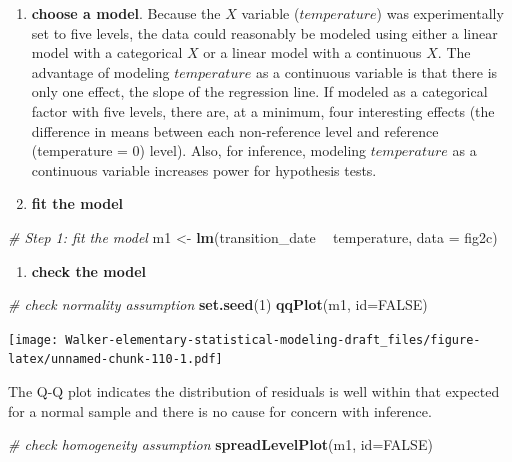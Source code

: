 \documentclass[]{book}
\newenvironment{Shaded}{\begin{snugshade}}{\end{snugshade}}
\newcommand{\CommentTok}[1]{\textcolor[rgb]{0.56,0.35,0.01}{\textit{#1}}}
\newcommand{\DataTypeTok}[1]{\textcolor[rgb]{0.13,0.29,0.53}{#1}}
\newcommand{\DecValTok}[1]{\textcolor[rgb]{0.00,0.00,0.81}{#1}}
\newcommand{\KeywordTok}[1]{\textcolor[rgb]{0.13,0.29,0.53}{\textbf{#1}}}
\newcommand{\NormalTok}[1]{#1}
\newcommand{\OperatorTok}[1]{\textcolor[rgb]{0.81,0.36,0.00}{\textbf{#1}}}
\newcommand{\OtherTok}[1]{\textcolor[rgb]{0.56,0.35,0.01}{#1}}
\newcommand{\StringTok}[1]{\textcolor[rgb]{0.31,0.60,0.02}{#1}}
\providecommand{\tightlist}{%
  \setlength{\itemsep}{0pt}\setlength{\parskip}{0pt}}
\begin{document}
\begin{enumerate}
\def\labelenumi{\arabic{enumi}.}
\setcounter{enumi}{1}
\item
  \textbf{choose a model}. Because the \(X\) variable (\(temperature\)) was experimentally set to five levels, the data could reasonably be modeled using either a linear model with a categorical \(X\) or a linear model with a continuous \(X\). The advantage of modeling \(temperature\) as a continuous variable is that there is only one effect, the slope of the regression line. If modeled as a categorical factor with five levels, there are, at a minimum, four interesting effects (the difference in means between each non-reference level and reference (temperature = 0) level). Also, for inference, modeling \(temperature\) as a continuous variable increases power for hypothesis tests.
\item
  \textbf{fit the model}
\end{enumerate}

\begin{Shaded}
\begin{Highlighting}[]
\CommentTok{# Step 1: fit the model}
\NormalTok{m1 <-}\StringTok{ }\KeywordTok{lm}\NormalTok{(transition_date }\OperatorTok{~}\StringTok{ }\NormalTok{temperature, }\DataTypeTok{data =}\NormalTok{ fig2c)}
\end{Highlighting}
\end{Shaded}

\begin{enumerate}
\def\labelenumi{\arabic{enumi}.}
\setcounter{enumi}{3}
\tightlist
\item
  \textbf{check the model}
\end{enumerate}

\begin{Shaded}
\begin{Highlighting}[]
\CommentTok{# check normality assumption}
\KeywordTok{set.seed}\NormalTok{(}\DecValTok{1}\NormalTok{)}
\KeywordTok{qqPlot}\NormalTok{(m1, }\DataTypeTok{id=}\OtherTok{FALSE}\NormalTok{)}
\end{Highlighting}
\end{Shaded}

\texttt{[image: Walker-elementary-statistical-modeling-draft\_files/figure-latex/unnamed-chunk-110-1.pdf]}

The Q-Q plot indicates the distribution of residuals is well within that expected for a normal sample and there is no cause for concern with inference.

\begin{Shaded}
\begin{Highlighting}[]
\CommentTok{# check homogeneity assumption}
\KeywordTok{spreadLevelPlot}\NormalTok{(m1, }\DataTypeTok{id=}\OtherTok{FALSE}\NormalTok{)}
\end{Highlighting}
\end{Shaded}
\end{document}
